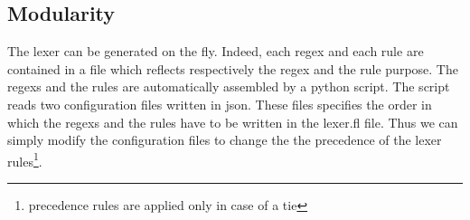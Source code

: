 \subsection{Modularity}
The lexer can be generated on the fly. Indeed, each regex and each rule are
contained in a file which reflects respectively the regex and the rule purpose.
The regexs and the rules are automatically assembled by a python script.
The script reads two configuration files written in json. These files specifies
the order in which the regexs and the rules have to be written in the lexer.fl
file. Thus we can simply modify the configuration files to change the
the precedence of the lexer rules\footnote{precedence rules are applied only in
case of a tie}.